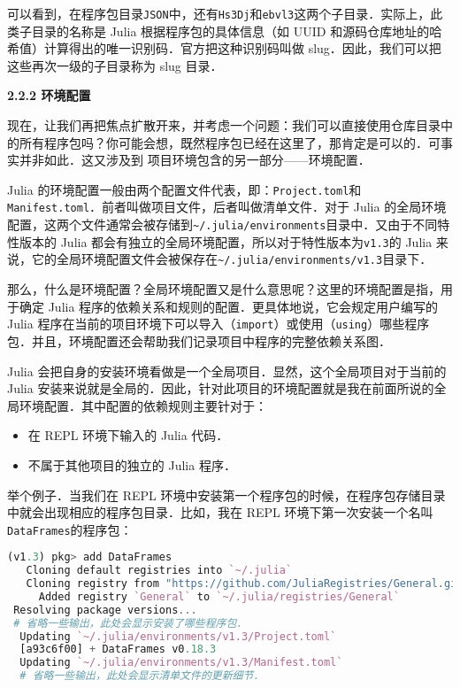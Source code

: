 可以看到，在程序包目录\verb|JSON|中，还有\verb|Hs3Dj|和\verb|ebvl3|这两个子目录．实际上，此类子目录的名称是 Julia 根据程序包的具体信息（如 UUID 和源码仓库地址的哈希值）计算得出的唯一识别码．官方把这种识别码叫做 slug．因此，我们可以把这些再次一级的子目录称为 slug 目录．

\textbf{2.2.2 环境配置}

现在，让我们再把焦点扩散开来，并考虑一个问题：我们可以直接使用仓库目录中的所有程序包吗？你可能会想，既然程序包已经在这里了，那肯定是可以的．可事实并非如此．这又涉及到 项目环境包含的另一部分——环境配置．

Julia 的环境配置一般由两个配置文件代表，即：\verb|Project.toml|和\verb|Manifest.toml|．前者叫做项目文件，后者叫做清单文件．对于 Julia 的全局环境配置，这两个文件通常会被存储到\verb|~/.julia/environments|目录中．又由于不同特性版本的 Julia 都会有独立的全局环境配置，所以对于特性版本为\verb|v1.3|的 Julia 来说，它的全局环境配置文件会被保存在\verb|~/.julia/environments/v1.3|目录下．

那么，什么是环境配置？全局环境配置又是什么意思呢？这里的环境配置是指，用于确定 Julia 程序的依赖关系和规则的配置．更具体地说，它会规定用户编写的 Julia 程序在当前的项目环境下可以导入（\verb|import|）或使用（\verb|using|）哪些程序包．并且，环境配置还会帮助我们记录项目中程序的完整依赖关系图．

Julia 会把自身的安装环境看做是一个全局项目．显然，这个全局项目对于当前的 Julia 安装来说就是全局的．因此，针对此项目的环境配置就是我在前面所说的全局环境配置．其中配置的依赖规则主要针对于：

\begin{itemize}
\item 在 REPL 环境下输入的 Julia 代码．
\item 不属于其他项目的独立的 Julia 程序．
\end{itemize}

举个例子．当我们在 REPL 环境中安装第一个程序包的时候，在程序包存储目录中就会出现相应的程序包目录．比如，我在 REPL 环境下第一次安装一个名叫\verb|DataFrames|的程序包：

\begin{lstlisting}[language=julia]
(v1.3) pkg> add DataFrames
   Cloning default registries into `~/.julia`
   Cloning registry from "https://github.com/JuliaRegistries/General.git"
     Added registry `General` to `~/.julia/registries/General`
 Resolving package versions...
 # 省略一些输出，此处会显示安装了哪些程序包．
  Updating `~/.julia/environments/v1.3/Project.toml`
  [a93c6f00] + DataFrames v0.18.3
  Updating `~/.julia/environments/v1.3/Manifest.toml`
  # 省略一些输出，此处会显示清单文件的更新细节．
\end{lstlisting}

